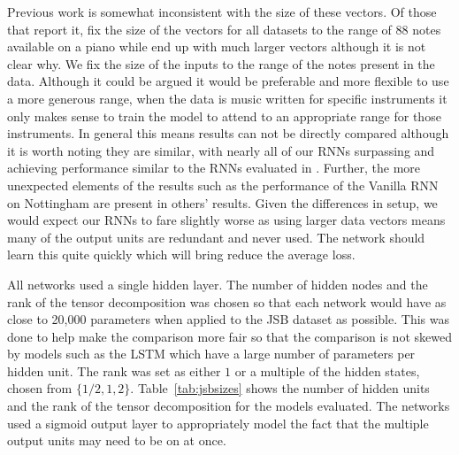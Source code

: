 Previous work is somewhat inconsistent with the size of these vectors. Of those that
report it, \autocite{Boulanger-Lewandowski2012} fix the size of the vectors for all
datasets to the range of 88 notes available on a piano while \autocite{Chung2014}
end up with much larger vectors although it is not clear why. We fix the size of the
inputs to the range of the notes present in the data. Although it could be argued it
would be preferable and more flexible to use a more generous range, when the data is
music written for specific instruments it only makes sense to train the model to attend
to an appropriate range for those instruments. In general this means
results can not be directly compared although it is worth noting they are similar,
with nearly all of our RNNs surpassing \autocite{Chung2014} and achieving performance
similar to the RNNs evaluated in \autocite{Boulanger-Lewandowski2012}. 
Further, the more unexpected elements of the results such as the performance of the
Vanilla RNN on Nottingham are present in others' results.
Given the differences
in setup, we would expect our RNNs to fare slightly worse as using larger data vectors
means many of the output units are redundant and never used. The network should learn this
quite quickly which will bring reduce the average loss.

All networks used a single hidden layer. The number of hidden nodes and the rank of
the tensor decomposition was chosen so that each network would have as close to
20,000 parameters when applied to the JSB dataset as possible. This was done to help
make the comparison more fair so that the comparison is not skewed by models such as
the LSTM which have a large number of parameters per hidden unit. The rank was set as
either \(1\) or a multiple of the hidden states, chosen from \(\{1/2, 1, 2\}\).
Table~\ref{tab:jsbsizes} shows the number of hidden units and the rank of the tensor
decomposition for the models evaluated. The networks used a sigmoid output layer to
appropriately model the fact that the multiple output units may need to be on at once.

